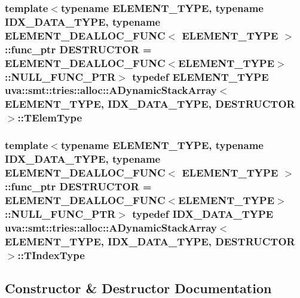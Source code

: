 \subsubsection[{T\+Elem\+Type}]{\setlength{\rightskip}{0pt plus 5cm}template$<$typename E\+L\+E\+M\+E\+N\+T\+\_\+\+T\+Y\+P\+E, typename I\+D\+X\+\_\+\+D\+A\+T\+A\+\_\+\+T\+Y\+P\+E, typename E\+L\+E\+M\+E\+N\+T\+\_\+\+D\+E\+A\+L\+L\+O\+C\+\_\+\+F\+U\+N\+C$<$ E\+L\+E\+M\+E\+N\+T\+\_\+\+T\+Y\+P\+E $>$\+::func\+\_\+ptr D\+E\+S\+T\+R\+U\+C\+T\+O\+R = E\+L\+E\+M\+E\+N\+T\+\_\+\+D\+E\+A\+L\+L\+O\+C\+\_\+\+F\+U\+N\+C$<$\+E\+L\+E\+M\+E\+N\+T\+\_\+\+T\+Y\+P\+E$>$\+::\+N\+U\+L\+L\+\_\+\+F\+U\+N\+C\+\_\+\+P\+T\+R$>$ typedef E\+L\+E\+M\+E\+N\+T\+\_\+\+T\+Y\+P\+E {\bf uva\+::smt\+::tries\+::alloc\+::\+A\+Dynamic\+Stack\+Array}$<$ E\+L\+E\+M\+E\+N\+T\+\_\+\+T\+Y\+P\+E, I\+D\+X\+\_\+\+D\+A\+T\+A\+\_\+\+T\+Y\+P\+E, D\+E\+S\+T\+R\+U\+C\+T\+O\+R $>$\+::{\bf T\+Elem\+Type}}\label{classuva_1_1smt_1_1tries_1_1alloc_1_1_a_dynamic_stack_array_a652b4bc4c3325566b346706e586815bd}
\hypertarget{classuva_1_1smt_1_1tries_1_1alloc_1_1_a_dynamic_stack_array_ae920c6bccc4c1b70d816f016967bbe08}{}
\subsubsection[{T\+Index\+Type}]{\setlength{\rightskip}{0pt plus 5cm}template$<$typename E\+L\+E\+M\+E\+N\+T\+\_\+\+T\+Y\+P\+E, typename I\+D\+X\+\_\+\+D\+A\+T\+A\+\_\+\+T\+Y\+P\+E, typename E\+L\+E\+M\+E\+N\+T\+\_\+\+D\+E\+A\+L\+L\+O\+C\+\_\+\+F\+U\+N\+C$<$ E\+L\+E\+M\+E\+N\+T\+\_\+\+T\+Y\+P\+E $>$\+::func\+\_\+ptr D\+E\+S\+T\+R\+U\+C\+T\+O\+R = E\+L\+E\+M\+E\+N\+T\+\_\+\+D\+E\+A\+L\+L\+O\+C\+\_\+\+F\+U\+N\+C$<$\+E\+L\+E\+M\+E\+N\+T\+\_\+\+T\+Y\+P\+E$>$\+::\+N\+U\+L\+L\+\_\+\+F\+U\+N\+C\+\_\+\+P\+T\+R$>$ typedef I\+D\+X\+\_\+\+D\+A\+T\+A\+\_\+\+T\+Y\+P\+E {\bf uva\+::smt\+::tries\+::alloc\+::\+A\+Dynamic\+Stack\+Array}$<$ E\+L\+E\+M\+E\+N\+T\+\_\+\+T\+Y\+P\+E, I\+D\+X\+\_\+\+D\+A\+T\+A\+\_\+\+T\+Y\+P\+E, D\+E\+S\+T\+R\+U\+C\+T\+O\+R $>$\+::{\bf T\+Index\+Type}}\label{classuva_1_1smt_1_1tries_1_1alloc_1_1_a_dynamic_stack_array_ae920c6bccc4c1b70d816f016967bbe08}


\subsection{Constructor \& Destructor Documentation}
\hypertarget{classuva_1_1smt_1_1tries_1_1alloc_1_1_a_dynamic_stack_array_a200d0cad1e0d31fd1839e44afea95cc6}{}
